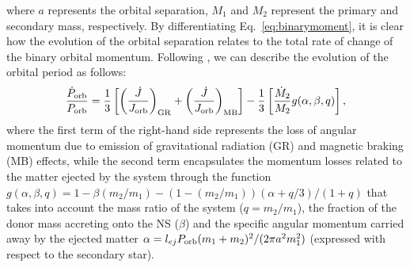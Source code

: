 \documentclass[fleqn,usenatbib]{mnras}
\begin{document}
where $a$ represents the orbital separation, $M_1$ and $M_2$ represent the primary and secondary mass, respectively. By differentiating Eq.~\ref{eq:binarymoment}, it is clear how the evolution of the orbital separation relates to the total rate of change of the binary orbital momentum. Following \citet{di-Salvo:2008uu}, we can describe the evolution of the orbital period as follows:
\begin{equation}
\label{eq:evomom}
\frac{\dot{P}_{\rm orb}}{P_{\rm orb}}=\frac{1}{3}\left[\left( \frac{\dot{J}}{J_{\rm orb}} \right)_{\rm GR}+\left( \frac{\dot{J}}{J_{\rm orb}} \right)_{\rm MB}\right]-\frac{1}{3}\left[\frac{\dot{M}_2}{M_2} g(\alpha,\beta,q)\right],
\end{equation}
where the first term of the right-hand side represents the loss of angular momentum due to emission of gravitational radiation (GR) and magnetic braking (MB) effects, while the second term encapsulates the momentum losses related to the matter ejected by the system through the function $g(\alpha,\beta,q) = 1 - \beta (m_2/m_1) - (1 -(m_2/m_1))(\alpha + q/3)/(1 + q)$ that takes into account the mass ratio of the system ($q=m_2/m_1$), the fraction of the donor mass accreting onto the NS ($\beta$) and the specific angular momentum carried away by the ejected matter $\alpha = l_{ej}P_{\rm orb} (m_1 + m_2)^2/(2\pi a^2 m_1^2)$ (expressed with respect to the secondary star).  
\end{document}
